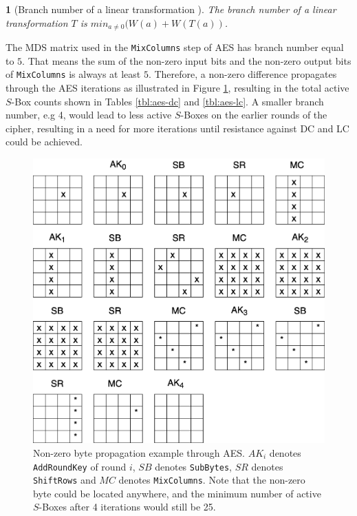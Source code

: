 \documentclass{report}
\newtheorem*{concept}{}{\bfseries}{\itshape}
\begin{document}
\begin{concept}[Branch number of a linear transformation \cite{RijndaelProposal}]
The \emph{branch number} of a linear transformation $T$ is $min_{a\neq0} (W(a) + W(T(a))$.
\end{concept}

The MDS matrix used in the \texttt{MixColumns} step of AES has branch number equal to $5$. That means the sum of the non-zero input bits and the non-zero output bits of \texttt{MixColumns} is always at least $5$. Therefore, a non-zero difference propagates through the AES iterations as illustrated in Figure \ref{fig:aes-trail}, resulting in the total active $S$-Box counts shown in Tables \ref{tbl:aes-dc} and \ref{tbl:aes-lc}. A smaller branch number, e.g 4, would lead to less active $S$-Boxes on the earlier rounds of the cipher, resulting in a need for more iterations until resistance against DC and LC could be achieved.

\begin{figure}[H]
    \centering
    \includegraphics[scale=0.3]{aes-mc.png}
    \caption{Non-zero byte propagation example through AES. $AK_i$ denotes \texttt{AddRoundKey} of round $i$, $SB$ denotes \texttt{SubBytes}, $SR$ denotes \texttt{ShiftRows} and $MC$ denotes \texttt{MixColumns}. Note that the non-zero byte could be located anywhere, and the minimum number of active $S$-Boxes after 4 iterations would still be 25.}
    \label{fig:aes-trail}
\end{figure}



\end{document}
